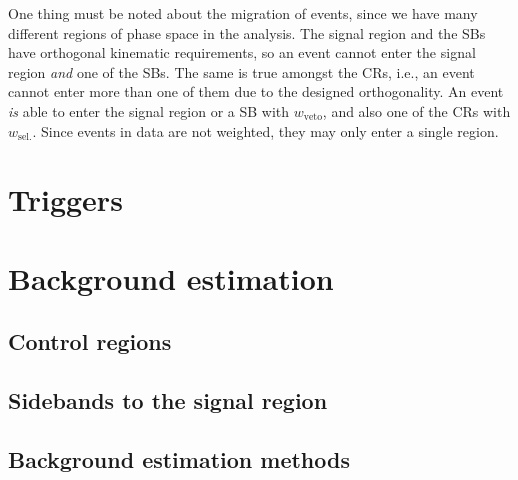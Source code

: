One thing must be noted about the migration of events, since we have many different regions of phase space in the analysis. The signal region and the \glspl{SB} have orthogonal kinematic requirements, so an event cannot enter the signal region \emph{and} one of the \glspl{SB}. The same is true amongst the \glspl{CR}, i.e., an event cannot enter more than one of them due to the designed orthogonality. An event \emph{is} able to enter the signal region or a \gls{SB} with $w_{\mathrm{veto}}$, and also one of the \glspl{CR} with $w_{\mathrm{sel.}}$. Since events in data are not weighted, they may only enter a single region.




\section{Triggers}
\label{sec:htoinv_triggers}

\section{Background estimation}
\label{sec:htoinv_background_est}

\subsection{Control regions}
\label{subsec:htoinv_crs}

\subsection{Sidebands to the signal region}
\label{subsec:htoinv_sidebands}

\subsection{Background estimation methods}
\label{subsec:htoinv_background_methods}
